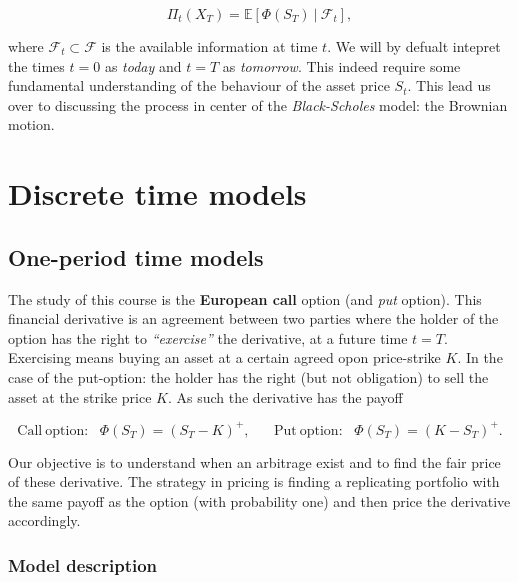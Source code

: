 \documentclass[
]{book}
\begin{document}
\[\Pi_t(X_T)=\mathbb{E}\left[\Phi(S_T)\ \vert\ \mathcal{F}_t\right],\]

where \(\mathcal{F}_t\subset\mathcal{F}\) is the available information at time \(t\). We will by defualt intepret the times \(t=0\) as \emph{today} and \(t=T\) as \emph{tomorrow}. This indeed require some fundamental understanding of the behaviour of the asset price \(S_t\). This lead us over to discussing the process in center of the \emph{Black-Scholes} model: the Brownian motion.

\hypertarget{discrete-time-models}{%
\section{Discrete time models}\label{discrete-time-models}}

\hypertarget{one-period-time-models}{%
\subsection{One-period time models}\label{one-period-time-models}}

The study of this course is the \textbf{European call} option (and \emph{put} option). This financial derivative is an agreement between two parties where the holder of the option has the right to \emph{``exercise''} the derivative, at a future time \(t=T\). Exercising means buying an asset at a certain agreed opon price-strike \(K\). In the case of the put-option: the holder has the right (but not obligation) to sell the asset at the strike price \(K\). As such the derivative has the payoff

\[\text{Call}\ \text{option:}\hspace{10pt}\Phi(S_T)=(S_T-K)^+,\hspace{20pt}\text{Put}\ \text{option:}\hspace{10pt}\Phi(S_T)=(K-S_T)^+.\]

Our objective is to understand when an arbitrage exist and to find the fair price of these derivative. The strategy in pricing is finding a replicating portfolio with the same payoff as the option (with probability one) and then price the derivative accordingly.

\hypertarget{model-description}{%
\subsubsection{Model description}\label{model-description}}
\end{document}
